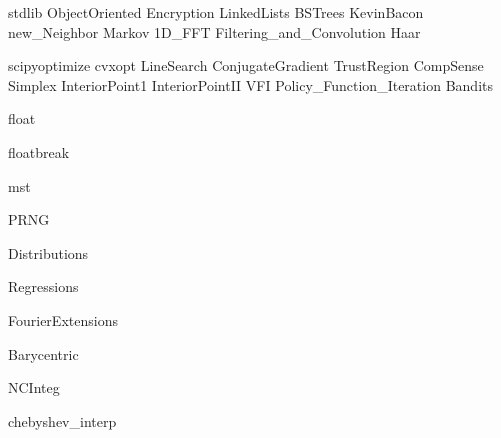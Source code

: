 \documentclass[nociteref]{SIAM-GH-book}
\begin{document}
{stdlib}
{ObjectOriented}
{Encryption}
{LinkedLists}
{BSTrees}
{KevinBacon}
{new_Neighbor}
{Markov}
{1D_FFT}
{Filtering_and_Convolution}
{Haar}


{scipyoptimize}
{cvxopt}
{LineSearch}
{ConjugateGradient}
{TrustRegion}
{CompSense}
{Simplex}
{InteriorPoint1}
{InteriorPointII}
{VFI}
{Policy_Function_Iteration}
{Bandits}



{float}

{floatbreak}

{mst}

{PRNG}

{Distributions}

{Regressions}

{FourierExtensions}

{Barycentric}

{NCInteg}

{chebyshev_interp}
\end{document}
